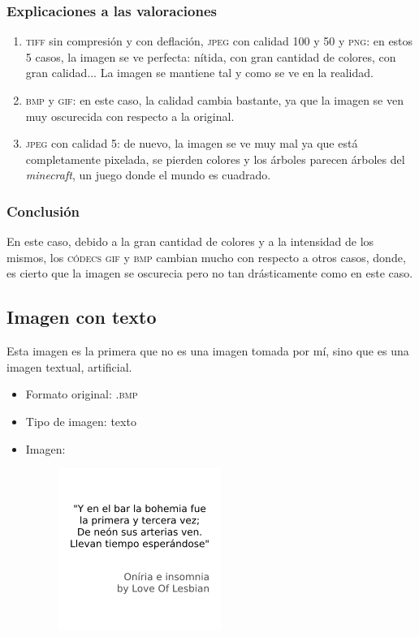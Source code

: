 \documentclass[11pt,a4paper]{article}
\begin{document}
\subsubsection{Explicaciones a las valoraciones}
\begin{enumerate}
	\item \textsc{tiff} sin compresión y con deflación, \textsc{jpeg} con calidad 100 y 50 y \textsc{png}: en estos 5 casos, la imagen se ve perfecta: nítida, con gran cantidad de colores, con gran calidad... La imagen se mantiene tal y como se ve en la realidad.
	\item \textsc{bmp} y \textsc{gif}: en este caso, la calidad cambia bastante, ya que la imagen se ven muy oscurecida con respecto a la original.
	\item \textsc{jpeg} con calidad 5: de nuevo, la imagen se ve muy mal ya que está completamente pixelada, se pierden colores y los árboles parecen árboles del \textit{minecraft}, un juego donde el mundo es cuadrado.
\end{enumerate}

\subsubsection{Conclusión}
En este caso, debido a la gran cantidad de colores y a la intensidad de los mismos, los \textsc{códecs} \textsc{gif} y \textsc{bmp} cambian mucho con respecto a otros casos, donde, es cierto que la imagen se oscurecia pero no tan drásticamente como en este caso.

\newpage

\subsection{Imagen con texto}

Esta imagen es la primera que no es una imagen tomada por mí, sino que es una imagen textual, artificial.

\begin{itemize}
	\item Formato original: \textsc{.bmp}
	\item Tipo de imagen: texto
	\item Imagen:
		\begin{figure}[H]
		\centering
			\includegraphics[width=0.5\textwidth]{Fotos/texto.png}
		\end{figure}	
\end{itemize}
\end{document}
